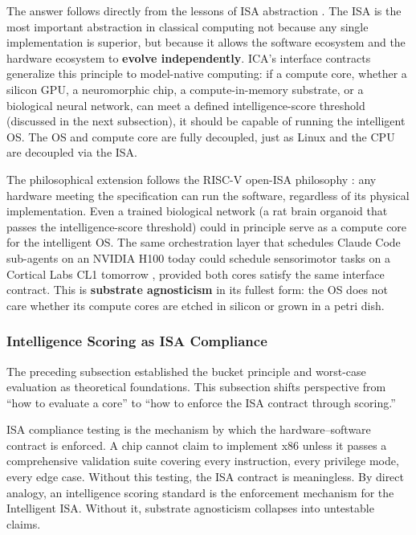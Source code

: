 The answer follows directly from the lessons of ISA abstraction \cite{patterson_hennessy_2017}. The ISA is the most important abstraction in classical computing not because any single implementation is superior, but because it allows the software ecosystem and the hardware ecosystem to \textbf{evolve independently}. ICA's interface contracts generalize this principle to model-native computing: if a compute core, whether a silicon GPU, a neuromorphic chip, a compute-in-memory substrate, or a biological neural network, can meet a defined intelligence-score threshold (discussed in the next subsection), it should be capable of running the intelligent OS. The OS and compute core are fully decoupled, just as Linux and the CPU are decoupled via the ISA.

The philosophical extension follows the RISC-V open-ISA philosophy \cite{hennessy_patterson_2019}: any hardware meeting the specification can run the software, regardless of its physical implementation. Even a trained biological network (a rat brain organoid that passes the intelligence-score threshold) could in principle serve as a compute core for the intelligent OS. The same orchestration layer that schedules Claude Code sub-agents on an NVIDIA H100 today could schedule sensorimotor tasks on a Cortical Labs CL1 tomorrow \cite{cortical_2025_cl1}, provided both cores satisfy the same interface contract. This is \textbf{substrate agnosticism} in its fullest form: the OS does not care whether its compute cores are etched in silicon or grown in a petri dish.

\subsubsection{Intelligence Scoring as ISA Compliance}

The preceding subsection established the bucket principle and worst-case evaluation as theoretical foundations. This subsection shifts perspective from ``how to evaluate a core'' to ``how to enforce the ISA contract through scoring.''

ISA compliance testing is the mechanism by which the hardware--software contract is enforced. A chip cannot claim to implement x86 unless it passes a comprehensive validation suite covering every instruction, every privilege mode, every edge case. Without this testing, the ISA contract is meaningless. By direct analogy, an intelligence scoring standard is the enforcement mechanism for the Intelligent ISA. Without it, substrate agnosticism collapses into untestable claims.

